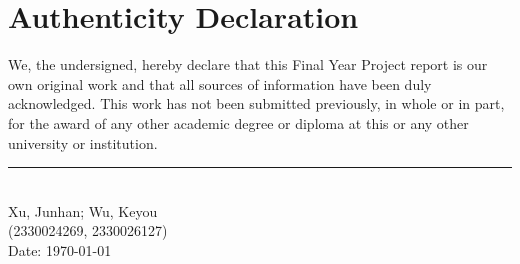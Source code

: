 \documentclass[11pt,a4paper,oneside]{report}
\begin{document}
\chapter*{Authenticity Declaration}
\thispagestyle{plain}

We, the undersigned, hereby declare that this Final Year Project report is our
own original work and that all sources of information have been duly
acknowledged. This work has not been submitted previously, in whole or in
part, for the award of any other academic degree or diploma at this or any
other university or institution.

\vspace{2cm}
\begin{flushright}
    \rule{6cm}{0.5pt}\\
    Xu, Junhan; Wu, Keyou\\
    (2330024269, 2330026127)\\
    Date: \today
\end{flushright}
\end{document}
